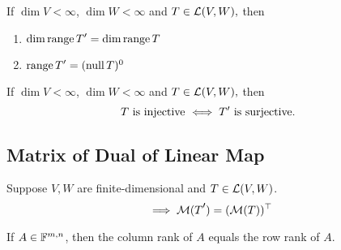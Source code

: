 \begin{thm}
    If $\dim V < \infty$, $\dim W<\infty$ and $T \in \mathcal{L} (V,W),$ then
    \begin{enumerate}
      \item $\dim \myrange \dual{T} = \dim \myrange T$
      \item $\myrange \dual{T} = (\mynull T)^0$
    \end{enumerate}
\end{thm}

\begin{thm} 
    If $\dim V < \infty$, $\dim W<\infty$ and $T \in \mathcal{L} (V,W),$ then
    \begin{equation}
      T $ is injective $ \iff \dual{T} $ is surjective. $
    \end{equation}
\end{thm}

\subsection{Matrix of Dual of Linear Map}

\setcounter{thm}{131}
\begin{thm}
  Suppose $V, W$ are finite-dimensional and $T \in \mathcal{L}(V,W)$.
  \begin{equation}
    \implies \mmatrix(\dual{T}) = (\mmatrix(T))^{\top}
  \end{equation}
\end{thm}

\begin{thm}
  If $A \in \mathbb{F}^{m,n}$, then the column rank of $A$ equals the row rank of $A$.
\end{thm}